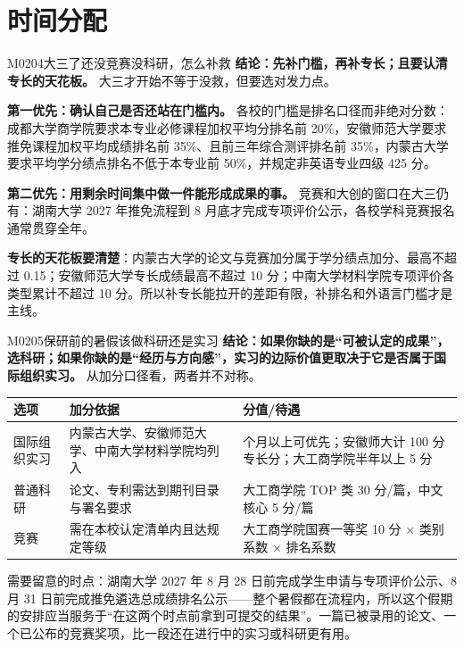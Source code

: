 \section{时间分配}
\begin{qa}{M0204}{大三了还没竞赛没科研，怎么补救}
\textbf{结论：先补门槛，再补专长；且要认清专长的天花板。} 大三才开始不等于没救，但要选对发力点。

\textbf{第一优先：确认自己是否还站在门槛内。} 各校的门槛是排名口径而非绝对分数：成都大学商学院要求本专业必修课程加权平均分排名前 20\%，安徽师范大学要求推免课程加权平均成绩排名前 35\%、且前三年综合测评排名前 35\%，内蒙古大学要求平均学分绩点排名不低于本专业前 50\%，并规定非英语专业四级 425 分。

\textbf{第二优先：用剩余时间集中做一件能形成成果的事。} 竞赛和大创的窗口在大三仍有：湖南大学 2027 年推免流程到 8 月底才完成专项评价公示，各校学科竞赛报名通常贯穿全年。

\textbf{专长的天花板要清楚}：内蒙古大学的论文与竞赛加分属于学分绩点加分、最高不超过 0.15；安徽师范大学专长成绩最高不超过 10 分；中南大学材料学院专项评价各类型累计不超过 10 分。所以补专长能拉开的差距有限，补排名和外语言门槛才是主线。
\end{qa}

\begin{qa}{M0205}{保研前的暑假该做科研还是实习}
\textbf{结论：如果你缺的是“可被认定的成果”，选科研；如果你缺的是“经历与方向感”，实习的边际价值更取决于它是否属于国际组织实习。} 从加分口径看，两者并不对称。

\par\vspace{2pt}\nobreak\begin{center}\footnotesize
\begin{tabularx}{\textwidth}{>{\raggedright\arraybackslash}X>{\raggedright\arraybackslash}X>{\raggedright\arraybackslash}X}
\toprule
\textbf{选项} & \textbf{加分依据} & \textbf{分值/待遇} \\ \midrule
国际组织实习 & 内蒙古大学、安徽师范大学、中南大学材料学院均列入 & 3 个月以上可优先；安徽师大计 100 分专长分；大工商学院半年以上 5 分 \\
普通科研 & 论文、专利需达到期刊目录与署名要求 & 大工商学院 TOP 类 30 分/篇，中文核心 5 分/篇 \\
竞赛 & 需在本校认定清单内且达规定等级 & 大工商学院国赛一等奖 10 分 × 类别系数 × 排名系数 \\
\bottomrule
\end{tabularx}
\end{center}\vspace{2pt}\par

需要留意的时点：湖南大学 2027 年 8 月 28 日前完成学生申请与专项评价公示、8 月 31 日前完成推免遴选总成绩排名公示——整个暑假都在流程内，所以这个假期的安排应当服务于“在这两个时点前拿到可提交的结果”。一篇已被录用的论文、一个已公布的竞赛奖项，比一段还在进行中的实习或科研更有用。
\end{qa}

